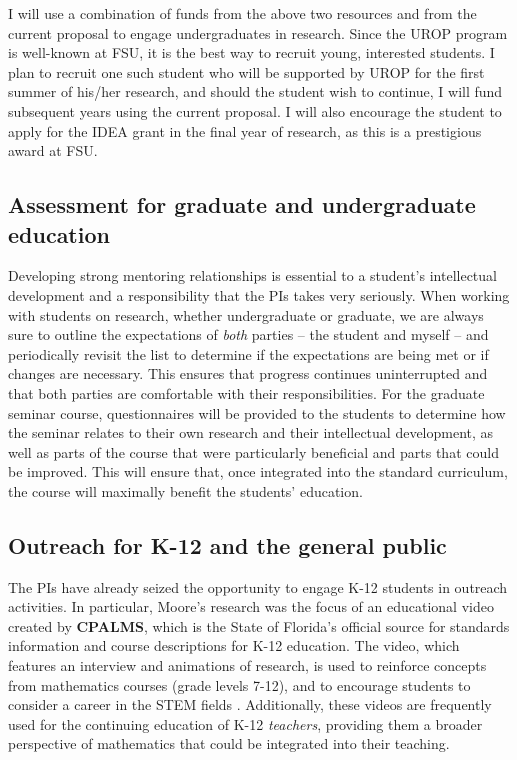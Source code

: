 \documentclass[11pt]{article}
\begin{document}
I will use a combination of funds from the above two resources and from the current proposal to engage undergraduates in research. Since the UROP program is well-known at FSU, it is the best way to recruit young, interested students. I plan to recruit one such student who will be supported by UROP for the first summer of his/her research, and should the student wish to continue, I will fund subsequent years using the current proposal. I will also encourage the student to apply for the IDEA grant in the final year of research, as this is a prestigious award at FSU. 


\subsection{Assessment for graduate and undergraduate education}

Developing strong mentoring relationships is essential to a student's intellectual development and a responsibility that the PIs takes very seriously. When working with students on research, whether undergraduate or graduate, we are always sure to outline the expectations of {\em both} parties -- the student and myself -- and periodically revisit the list to determine if the expectations are being met or if changes are necessary. This ensures that progress continues uninterrupted and that both parties are comfortable with their responsibilities. For the graduate seminar course, questionnaires will be provided to the students to determine how the seminar relates to their own research and their intellectual development, as well as parts of the course that were particularly beneficial and parts that could be improved. This will ensure that, once integrated into the standard curriculum, the course will maximally benefit the students' education.


\subsection{Outreach for K-12 and the general public}

The PIs have already seized the opportunity to engage K-12 students in outreach activities. In particular, Moore's research was the focus of an educational video created by {\bf CPALMS}, which is the State of Florida's official source for standards information and course descriptions for K-12 education. The video, which features an interview and animations of research, is used to reinforce concepts from mathematics courses (grade levels 7-12), and to encourage students to consider a career in the STEM fields \cite{CPALMS}. Additionally, these videos are frequently used for the continuing education of K-12 {\em teachers}, providing them a broader perspective of mathematics that could be integrated into their teaching.
 
\end{document}
